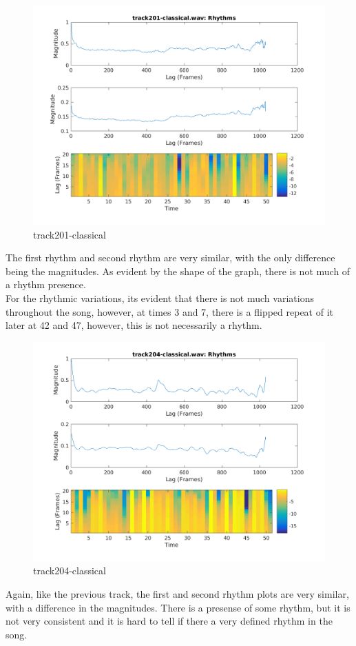 \documentclass[11pt, a4paper]{article}
\begin{document}
\begin{figure}[H]
    \centering
    \includegraphics[width=.8\textwidth]{track201-classical-Rhythm.png}
    \caption{track201-classical}
\end{figure}

The first rhythm and second rhythm are very similar, with the only difference being the magnitudes. As evident by the shape of the graph, there is not much of a rhythm presence. \\

For the rhythmic variations, its evident that there is not much variations throughout the song, however, at times 3 and 7, there is a flipped repeat of it later at 42 and 47, however, this is not necessarily a rhythm. 

\begin{figure}[H]
    \centering
    \includegraphics[width=.8\textwidth]{track204-classical-Rhythm.png}
    \caption{track204-classical}
\end{figure}

Again, like the previous track, the first and second rhythm plots are very similar, with a difference in the magnitudes. There is a presense of some rhythm, but it is not very consistent and it is hard to tell if there a very defined rhythm in the song. \\
\end{document}
